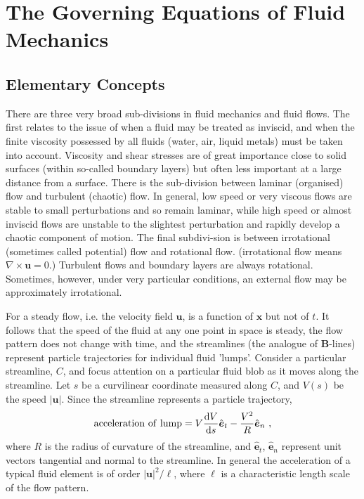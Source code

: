 \documentclass[12pt,a4paper]{article}
\renewcommand{\vec}[1]{\boldsymbol{#1}}
\newcommand{\dif}{\mathrm{d}}
\begin{document}
\section{The Governing Equations of Fluid Mechanics}
\subsection{Elementary Concepts}
\cite{2001imhd.book.....D} There are three very broad sub-divisions in fluid mechanics and fluid flows. The first relates to the issue of when a fluid may be treated as inviscid, and when the finite viscosity possessed by all fluids (water, air, liquid metals) must be taken into account. Viscosity and shear stresses are of great importance close to solid surfaces (within so-called boundary layers) but often less important at a large distance from a surface. There is the sub-division between laminar (organised) flow and turbulent (chaotic) flow. In general, low speed or very viscous flows are stable to small perturbations and so remain laminar, while high speed or almost inviscid flows are unstable to the slightest perturbation and rapidly develop a chaotic component of motion. The final subdivi-sion is between irrotational (sometimes called potential) flow and rotational flow. (irrotational flow means $\nabla \times \vec{u} = 0$.) Turbulent flows and boundary layers are always rotational. Sometimes, however, under very particular conditions, an external flow may be approximately irrotational. 

For a steady flow, i.e. the velocity field $\vec{u}$, is a function of $\vec{x}$ but not of $t$. It follows that the speed of the fluid at any one point in space is steady, the flow pattern does not change with time, and the streamlines (the analogue of $\vec{B}$-lines) represent particle trajectories for individual fluid 'lumps'. Consider a particular streamline, $C$, and focus attention on a particular fluid blob as it moves along the streamline. Let $s$ be a curvilinear coordinate measured along $C$, and $V(s)$ be the speed $|\vec{u}|$. Since the streamline represents a particle trajectory, 
\begin{equation}
{\rm acceleration ~ of ~ lump} = V \frac{\dif V}{\dif s} \hat{\vec{e}}_t -\frac{V^2}{R} \hat{\vec{e}}_n ~,
\end{equation}
where $R$ is the radius of curvature of the streamline, and $\hat{\vec{e}}_t$, $\hat{\vec{e}}_n$ represent unit vectors tangential and normal to the streamline. In general the acceleration of a typical fluid element is of order $|\vec{u}|^2/\ell$, where $\ell$ is a
characteristic length scale of the flow pattern.
\end{document}
